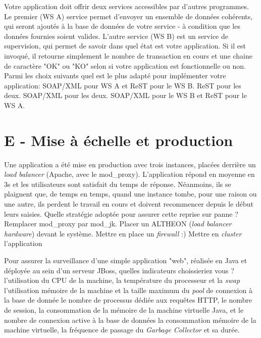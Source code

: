 \documentclass[a4paper,10pt]{article}
\begin{document}
\begin{question}{Votre application doit offrir deux services accessibles par d'autres programmes. Le
premier (WS A) service permet d'envoyer un ensemble de données cohérents, qui seront ajoutés à la base de
données de votre service - à condition que les données fournies soient valides. L'autre service (WS
B) est un service de supervision, qui permet de savoir dans quel état est votre application. Si il est
invoqué, il retourne simplement le nombre de transaction en cours et une chaine de caractère "OK" ou
"KO" selon si votre application est fonctionnelle ou non. Parmi les choix suivants quel est le plus
adapté pour implémenter votre application:}
  \true SOAP/XML pour WS A et ReST pour le WS B.
  \false ReST pour les deux.
  \false SOAP/XML pour les deux.
  \false SOAP/XML pour le WS B et ReST pour le WS A.
\end{question}

\section{E - Mise à échelle et production}

\begin{question}{Une application a été mise en production avec trois instances, placées derrière un
\textit{load balancer} (Apache, avec le mod\_proxy). L'application répond en moyenne en 3s et les
utilisateurs sont satisfait du temps de réponse. Néanmoins, ils se plaignent que, de temps en temps,
quand une instance tombe, pour une raison ou une autre, ils perdent le travail en cours et doivent
recommencer depuis le début leurs saisies. Quelle stratégie adoptée pour assurer cette reprise sur
panne ?}
  \false Remplacer mod\_proxy par mod\_jk.
  \false Placer un ALTHEON (\textit{load balancer hardware}) devant le système.
  \false Mettre en place un \textit{firewall} :)
  \true Mettre en \textit{cluster} l'application
\end{question}

\begin{question}{Pour assurer la surveillance d'une simple application "web", réalisée en Java et
déployée au sein d'un serveur JBoss, quelles indicateurs choissieriez vous ?}
  \false l'utilisation du CPU de la machine, la température du processeur et la \textit{swap}
  \false l'utilisation mémoire de la machine et la taille maximum du \textit{pool} de connexion à la
  base de donnée
  \true le nombre de processus dédiée aux requêtes HTTP, le nombre de session, la consommation de la
  mémoire de la machine virtuelle Java, et le nombre de connexion active à la base de données
  \false la consommation mémoire de la machine virtuelle, la fréquence de passage du \textit{Garbage
  Collector} et sa durée.
\end{question}
\end{document}

